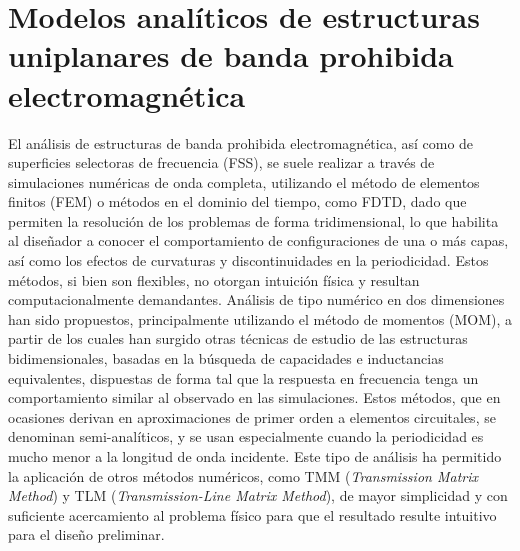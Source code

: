 \section{Modelos analíticos de estructuras uniplanares de banda prohibida electromagnética}
\label{sec:modelo_analitico}




El análisis de estructuras de banda prohibida electromagnética, así como de superficies selectoras de frecuencia (FSS), se suele realizar a través de simulaciones numéricas de onda completa, utilizando el método de elementos finitos (FEM) o métodos en el dominio del tiempo, como FDTD, dado que permiten la resolución de los problemas de forma tridimensional, lo que habilita al diseñador a conocer el comportamiento de configuraciones de una o más capas, así como los efectos de curvaturas y discontinuidades en la periodicidad. Estos métodos, si bien son flexibles, no otorgan intuición física y resultan computacionalmente demandantes. Análisis de tipo numérico en dos dimensiones han sido propuestos, principalmente utilizando el método de momentos (MOM), a partir de los cuales han surgido otras técnicas de estudio de las estructuras bidimensionales, basadas en la búsqueda de capacidades e inductancias equivalentes, dispuestas de forma tal que la respuesta en frecuencia tenga un comportamiento similar al observado en las simulaciones. Estos métodos, que en ocasiones derivan en aproximaciones de primer orden a elementos circuitales, se denominan semi-analíticos, y se usan especialmente cuando la periodicidad es mucho menor a la longitud de onda incidente. Este tipo de análisis ha permitido la aplicación de otros métodos numéricos, como TMM (\textit{Transmission Matrix Method}) y TLM (\textit{Transmission-Line Matrix Method}), de mayor simplicidad y con suficiente acercamiento al problema físico para que el resultado resulte intuitivo para el diseño preliminar.

